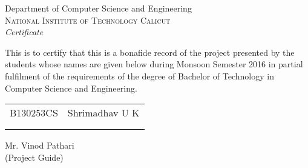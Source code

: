 \newpage
\thispagestyle{empty}

\begin{center}

\huge{Department of Computer Science and Engineering}\\[0.5cm]
\normalsize
\textsc{National Institute of Technology Calicut}\\[2.0cm]

\emph{\LARGE Certificate}\\[2.5cm]
\end{center}
\normalsize This is to certify that this is a bonafide record of the project presented by the students whose names are given below during Monsoon Semester 2016 in partial fulfilment of the requirements of the degree of Bachelor of Technology in Computer Science and Engineering.\\[1.0cm]

\begin{table}[h]
\centering
\begin{tabular}{lr}
B130253CS & Shrimadhav U K \\ \\ \hline
\\
\end{tabular}
\end{table}

\vfill


\begin{flushright}
Mr. Vinod Pathari\\
(Project Guide)\\[1.5cm]
\end{flushright}

